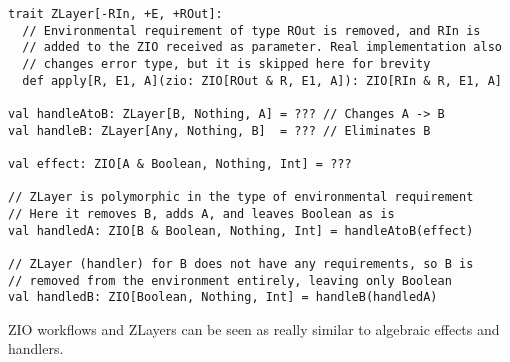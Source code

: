 \begin{algorithm}

\begin{verbatim}
trait ZLayer[-RIn, +E, +ROut]:
  // Environmental requirement of type ROut is removed, and RIn is
  // added to the ZIO received as parameter. Real implementation also
  // changes error type, but it is skipped here for brevity
  def apply[R, E1, A](zio: ZIO[ROut & R, E1, A]): ZIO[RIn & R, E1, A]

val handleAtoB: ZLayer[B, Nothing, A] = ??? // Changes A -> B
val handleB: ZLayer[Any, Nothing, B]  = ??? // Eliminates B

val effect: ZIO[A & Boolean, Nothing, Int] = ???

// ZLayer is polymorphic in the type of environmental requirement
// Here it removes B, adds A, and leaves Boolean as is
val handledA: ZIO[B & Boolean, Nothing, Int] = handleAtoB(effect)

// ZLayer (handler) for B does not have any requirements, so B is
// removed from the environment entirely, leaving only Boolean
val handledB: ZIO[Boolean, Nothing, Int] = handleB(handledA)
\end{verbatim}

\caption{ZIO workflows and ZLayers can be seen as really similar to algebraic effects and handlers. \label{zio:zlayer-eff-handler}}
\end{algorithm}